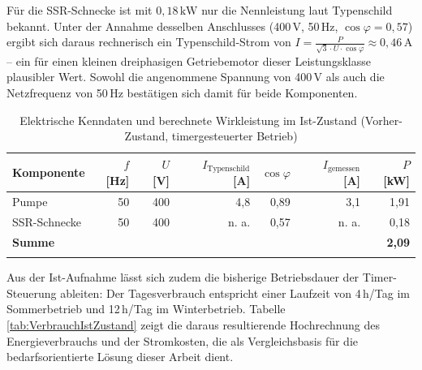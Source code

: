 Für die SSR-Schnecke ist mit $0,18\,\text{kW}$ nur die Nennleistung laut Typenschild bekannt. Unter der Annahme desselben Anschlusses (400\,V, 50\,Hz, $\cos\varphi=0,57$) ergibt sich daraus rechnerisch ein Typenschild-Strom von $I=\frac{P}{\sqrt{3}\cdot U\cdot\cos\varphi}\approx 0,46\,\text{A}$ -- ein für einen kleinen dreiphasigen Getriebemotor dieser Leistungsklasse plausibler Wert. Sowohl die angenommene Spannung von 400\,V als auch die Netzfrequenz von 50\,Hz bestätigen sich damit für beide Komponenten.

\begin{table}[h]
    \centering
    \begin{tabular}{lrrrrrr}
        \hline
        Komponente & $f$ [Hz] & $U$ [V] & $I_{\text{Typenschild}}$ [A] & $\cos\varphi$ & $I_{\text{gemessen}}$ [A] & $P$ [kW] \\
        \hline
        Pumpe        & 50 & 400 & 4,8 & 0,89 & 3,1 & 1,91 \\
        SSR-Schnecke & 50 & 400 & n. a. & 0,57 & n. a. & 0,18 \\
        \hline
        \textbf{Summe} & & & & & & \textbf{2,09} \\
        \hline
        \\
    \end{tabular}
    \caption{Elektrische Kenndaten und berechnete Wirkleistung im Ist-Zustand (Vorher-Zustand, timergesteuerter Betrieb)}
    \label{tab:LeistungIstZustand}
\end{table}

Aus der Ist-Aufnahme lässt sich zudem die bisherige Betriebsdauer der Timer-Steuerung ableiten: Der Tagesverbrauch entspricht einer Laufzeit von 4\,h/Tag im Sommerbetrieb und 12\,h/Tag im Winterbetrieb. Tabelle \ref{tab:VerbrauchIstZustand} zeigt die daraus resultierende Hochrechnung des Energieverbrauchs und der Stromkosten, die als Vergleichsbasis für die bedarfsorientierte Lösung dieser Arbeit dient.

